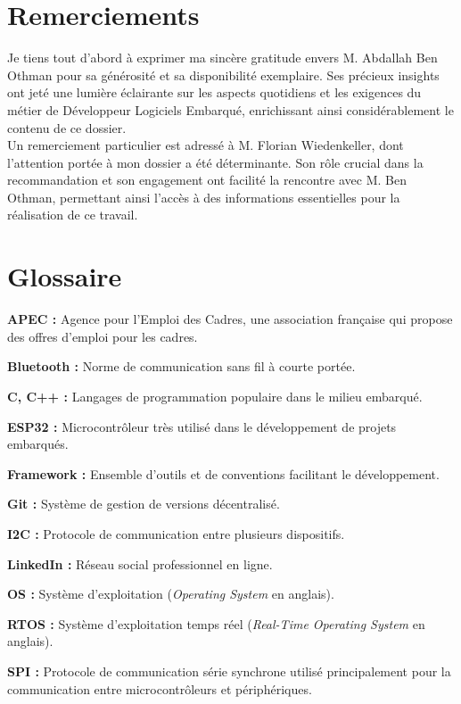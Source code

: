 \documentclass[a4paper,12pt]{report}
\begin{document}
\newpage
\section*{Remerciements}
Je tiens tout d'abord à exprimer ma sincère gratitude envers M. Abdallah Ben Othman pour sa générosité et sa disponibilité exemplaire. Ses précieux insights ont jeté une lumière éclairante sur les aspects quotidiens et les exigences du métier de Développeur Logiciels Embarqué, enrichissant ainsi considérablement le contenu de ce dossier.\\

Un remerciement particulier est adressé à M. Florian Wiedenkeller, dont l'attention portée à mon dossier a été déterminante. Son rôle crucial dans la recommandation et son engagement ont facilité la rencontre avec M. Ben Othman, permettant ainsi l'accès à des informations essentielles pour la réalisation de ce travail.

\newpage
\tableofcontents
\newpage


\newpage
\section*{Glossaire}

\textbf{APEC :} Agence pour l'Emploi des Cadres, une association française qui propose des offres d'emploi pour les cadres.

\textbf{Bluetooth :} Norme de communication sans fil à courte portée.

\textbf{C, C++ :} Langages de programmation populaire dans le milieu embarqué.

\textbf{ESP32 :} Microcontrôleur très utilisé dans le développement de projets embarqués.

\textbf{Framework :} Ensemble d'outils et de conventions facilitant le développement.

\textbf{Git :} Système de gestion de versions décentralisé.

\textbf{I2C :} Protocole de communication entre plusieurs dispositifs.

\textbf{LinkedIn :} Réseau social professionnel en ligne.

\textbf{OS :} Système d'exploitation (\textit{Operating System} en anglais).

\textbf{RTOS :} Système d'exploitation temps réel (\textit{Real-Time Operating System} en anglais).

\textbf{SPI :} Protocole de communication série synchrone utilisé principalement pour la communication entre microcontrôleurs et périphériques.
\end{document}

